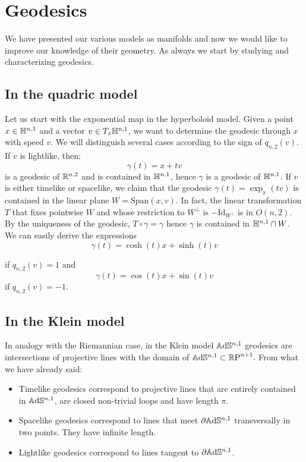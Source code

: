 \section{Geodesics}
We have presented our various models as manifolds and now we would like to improve our knowledge of their geometry. As always we start by studying and characterizing geodesics.
\subsection{In the quadric model} Let us start with the exponential map in the hyperboloid model. Given a point $x\in \mathbb{H}^{n,1}$ and a vector $v\in T_x\mathbb{H}^{n,1}$, we want to determine the geodesic through $x$ with speed $v$. We will distinguish several cases according to the sign of $ q_{n,2}(v)$. If $v$ is lightlike, then: 
\[
    \gamma(t)=x+tv
\] is a geodesic of $\mathbb{R}^{n,2}$ and is contained in $\mathbb{H}^{n,1}$, hence $\gamma$ is a geodesic of $\mathbb{H}^{n,1}$. If $v$ is either timelike or spacelike, we claim that the geodesic $\gamma(t)=\exp_x(tv)$ is contained in the linear plane $W=\text{Span}(x,v).$ In fact, the linear transformation $T$ that fixes pointwise $W$ and whose restriction to $W^\perp$ is $-\text{Id}_{W^\perp}$ is in $O(n,2)$. By the uniqueness of the geodesic, $T\circ\gamma=\gamma$ hence $\gamma$ is contained in $\mathbb{H}^{n,1}\cap W$. We can easily derive the expressions\\
\begin{equation}
    \gamma(t)=\cosh(t)x+\sinh(t)v
\end{equation}

if $q_{n,2}(v)=1$ and 
\begin{equation}\label{212}
    \gamma(t)=\cos(t)x+\sin(t)v
\end{equation}
if $q_{n,2}(v)=-1$.\\

\subsection{In the Klein model} In analogy with the Riemannian case, in the Klein model $\mathbb{A}\mathrm{d}\mathbb{S}^{n,1}$ geodesics are intersections of projective lines with the domain of $\mathbb{A}\mathrm{d}\mathbb{S}^{n,1}\subset\mathbb{R} \text{P}^{n+1}.$ From what we have already said: 
\begin{itemize}
    \item Timelike geodesics correspond to projective lines that are entirely contained in $\mathbb{A}\mathrm{d}\mathbb{S}^{n,1}$, are closed non-trivial loops and have length $\pi.$ 
    \item Spacelike geodesics correspond to lines that meet $\partial \mathbb{A}\mathrm{d}\mathbb{S}^{n,1}$ transversally in two points. They have infinite length.
    \item Lightlike geodesics correspond to lines tangent to $\partial\mathbb{A}\mathrm{d}\mathbb{S}^{n,1}$.   
\end{itemize}

